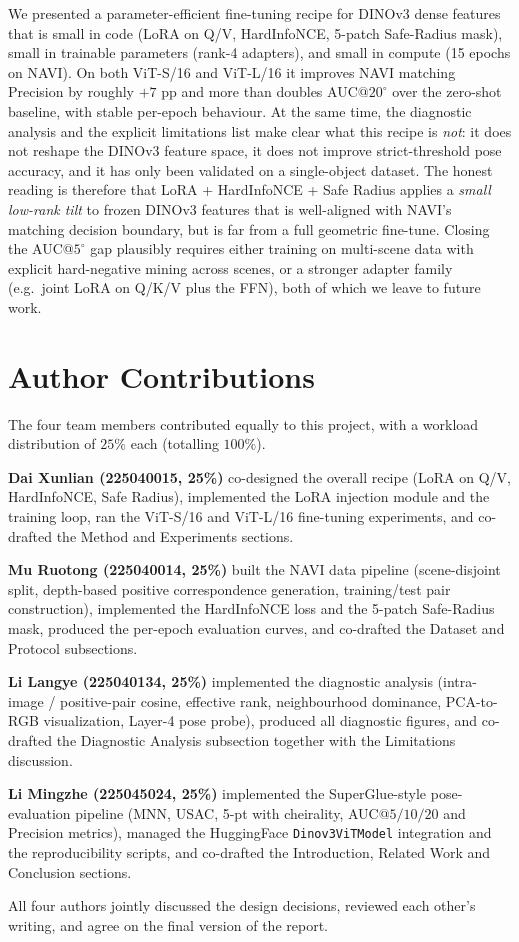 \documentclass[10pt,twocolumn,letterpaper]{article}
\begin{document}
We presented a parameter-efficient fine-tuning recipe for DINOv3
dense features that is small in code (LoRA on Q/V, HardInfoNCE,
5-patch Safe-Radius mask), small in trainable parameters (rank-4
adapters), and small in compute (15 epochs on NAVI). On both
ViT-S/16 and ViT-L/16 it improves NAVI matching Precision by
roughly $+7$ pp and more than doubles AUC@$20^\circ$ over the
zero-shot baseline, with stable per-epoch behaviour. At the same
time, the diagnostic analysis and the explicit limitations list
make clear what this recipe is \emph{not}: it does not reshape the
DINOv3 feature space, it does not improve strict-threshold pose
accuracy, and it has only been validated on a single-object dataset.
The honest reading is therefore that LoRA + HardInfoNCE + Safe Radius
applies a \emph{small low-rank tilt} to frozen DINOv3 features that
is well-aligned with NAVI's matching decision boundary, but is far
from a full geometric fine-tune. Closing the AUC@$5^\circ$ gap
plausibly requires either training on multi-scene data with explicit
hard-negative mining across scenes, or a stronger adapter family
(e.g.\ joint LoRA on Q/K/V plus the FFN), both of which we leave to
future work.

\section*{Author Contributions}

The four team members contributed equally to this project, with a
workload distribution of $25\%$ each (totalling $100\%$).

\textbf{Dai Xunlian (225040015, 25\%)} co-designed the overall
recipe (LoRA on Q/V, HardInfoNCE, Safe Radius), implemented the
LoRA injection module and the training loop, ran the ViT-S/16 and
ViT-L/16 fine-tuning experiments, and co-drafted the Method and
Experiments sections.

\textbf{Mu Ruotong (225040014, 25\%)} built the NAVI data pipeline
(scene-disjoint split, depth-based positive correspondence
generation, training/test pair construction), implemented the
HardInfoNCE loss and the 5-patch Safe-Radius mask, produced the
per-epoch evaluation curves, and co-drafted the Dataset and
Protocol subsections.

\textbf{Li Langye (225040134, 25\%)} implemented the diagnostic
analysis (intra-image / positive-pair cosine, effective rank,
neighbourhood dominance, PCA-to-RGB visualization, Layer-4 pose
probe), produced all diagnostic figures, and co-drafted the
Diagnostic Analysis subsection together with the Limitations
discussion.

\textbf{Li Mingzhe (225045024, 25\%)} implemented the
SuperGlue-style pose-evaluation pipeline (MNN, USAC, 5-pt with
cheirality, AUC@$5/10/20$ and Precision metrics), managed the
HuggingFace \texttt{Dinov3ViTModel} integration and the
reproducibility scripts, and co-drafted the Introduction, Related
Work and Conclusion sections.

All four authors jointly discussed the design decisions, reviewed
each other's writing, and agree on the final version of the
report.
{
    \small
    
    
}
\end{document}
